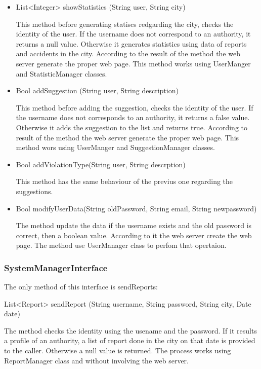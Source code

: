 \begin{itemize}
	 \item
	List<Integer> showStatistics (String user, String city)
	
	This method before generating statiscs redgarding the city, checks the identity of the user. 
	If the username does not correspond to an authority, it returns a null value.
	Otherwise it generates statistics using data of reports and accidents in the city.
	According to the result of the method the web server generate the proper web page.
	This method works using UserManger and StatisticManager classes.
	
	\item 
	Bool addSuggestion (String user, String description)
	
	This method before adding the suggestion, checks the identity of the user. 
	If the username does not corresponds to an authority, it returns a false value.
	Otherwise it adds the suggestion to the list and returns true.
	According to result of the method the web server generate the proper web page.
	This method wors using UserManger and SuggestionManager classes.
	
	\item 
	Bool addViolationType(String user, String descrption)
	
	This method has the same behaviour of the previus one regarding the suggestions.
	
	\item 
	Bool modifyUserData(String oldPassword, String email, String newpassword)
	
	The method update the data if the username exists and the old password is correct, then
	a boolean value. According to it the web server create the web page.
	The method use UserManager class to perfom that opertaion.
\end{itemize}

\subsubsection{SystemManagerInterface}

The only method of this interface is sendReports:
\hfill

List<Report> sendReport (String username, String password, String city, Date date)



The method checks the identity using the usename and the password. If it results a profile of an authority, a list of report done in the city on that date is provided to the caller. Otherwise a null value is returned.
The process works using ReportManager class and without involving the web server.


